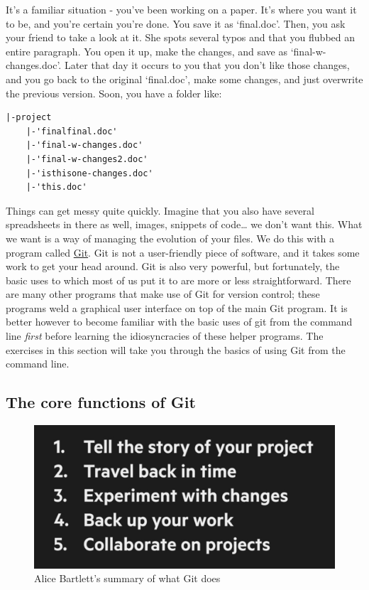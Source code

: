 \documentclass[english,]{book}
\begin{document}
It's a familiar situation - you've been working on a paper. It's where
you want it to be, and you're certain you're done. You save it as
`final.doc'. Then, you ask your friend to take a look at it. She spots
several typos and that you flubbed an entire paragraph. You open it up,
make the changes, and save as `final-w-changes.doc'. Later that day it
occurs to you that you don't like those changes, and you go back to the
original `final.doc', make some changes, and just overwrite the previous
version. Soon, you have a folder like:

\begin{verbatim}
|-project
    |-'finalfinal.doc'
    |-'final-w-changes.doc'
    |-'final-w-changes2.doc'
    |-'isthisone-changes.doc'
    |-'this.doc'
\end{verbatim}

Things can get messy quite quickly. Imagine that you also have several
spreadsheets in there as well, images, snippets of code\ldots{} we don't
want this. What we want is a way of managing the evolution of your
files. We do this with a program called
\href{https://git-scm.com/}{Git}. Git is not a user-friendly piece of
software, and it takes some work to get your head around. Git is also
very powerful, but fortunately, the basic uses to which most of us put
it to are more or less straightforward. There are many other programs
that make use of Git for version control; these programs weld a
graphical user interface on top of the main Git program. It is better
however to become familiar with the basic uses of git from the command
line \emph{first} before learning the idiosyncracies of these helper
programs. The exercises in this section will take you through the basics
of using Git from the command line.

\subsection{The core functions of Git}\label{the-core-functions-of-git}

\begin{figure}[htbp]
\centering
\includegraphics{images/what-git-does.png}
\caption{Alice Bartlett's summary of what Git does}
\end{figure}
\end{document}

